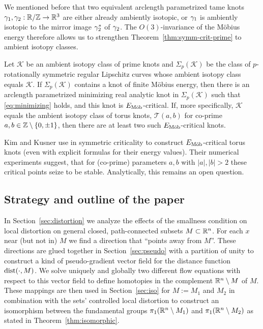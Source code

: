 We mentioned before that two equivalent arclength parametrized tame
knots $\gamma_1,\gamma_2:\mathbb{R}/\mathbb{Z}\to\mathbb{R}^3$ are either already ambiently isotopic, or
$\gamma_1$ is ambiently isotopic to the mirror image $\gamma_2^*$ of $\gamma_2$.
The $O(3)$-invariance of the M\"obius energy therefore
allows us to 
strengthen Theorem~\ref{thm:symm-crit-prime} to ambient isotopy
classes.
\begin{corollary} \label{cor:symm-crit-prime}
Let $\mathcal{K}$ be an ambient isotopy class of prime knots and $\Sigma_p(\mathcal{K})$ be the class of $p$-rotationally symmetric regular Lipschitz
curves whose ambient isotopy class equals $\mathcal{K}$. If
$\Sigma_p(\mathcal{K})$ contains a knot of
finite M\"obius energy, then there is an arclength parametrized
minimizing real analytic knot in $\Sigma_p(\mathcal{K})$ such that
\eqref{eq:minimizing} holds, and this knot is ${E_\textnormal{M\"ob}}$-critical. If,
more specifically,
$\mathcal{K}$ equals the ambient isotopy class of torus knots,
$\mathcal{T}(a,b)$ for co-prime $a,b\in\mathbb{Z}\setminus\{0,\pm 1\}$, then there
are at least two such ${E_\textnormal{M\"ob}}$-critical knots.
\end{corollary}
Kim and Kusner use in \cite{kim-kusner_1993}
symmetric criticality to construct ${E_\textnormal{M\"ob}}$-critical torus 
knots (even with explicit formulas for their energy values). 
Their numerical experiments suggest, that
for (co-prime) parameters $a,b$ with $|a|,|b|>2$ 
these critical
points seize to be stable. Analytically, this remains an
open question. 




\subsection{Strategy and outline of the paper}\label{sec:strategy}
In Section~\ref{sec:distortion} we analyze the effects
of the smallness
condition on local distortion  on general
closed, path-connected subsets $M\subset\mathbb{R}^n$. For 
each $x$ near (but not in) $M$ we find
a direction that ``points away from $M$''. These
directions are glued together in Section~\ref{sec:pseudo}
with a partition of unity to construct a kind of
pseudo-gradient vector field for the distance function $\operatorname{dist}(\cdot,M)$.  We solve
uniquely and globally two different flow equations with respect
to this vector field to define homotopies in the complement
$\mathbb{R}^n\setminus M$ of $M$. These mappings are then used in Section~\ref{sec:iso} 
for $M:=M_1$ and $M_2$ in combination with the sets' 
controlled local distortion
to construct  an
isomorphism between the fundamental groups
$\pi_1(\mathbb{R}^n\setminus M_1)$ and $\pi_1(\mathbb{R}^n\setminus M_2)$ as stated in 
Theorem~\ref{thm:isomorphic}. 

